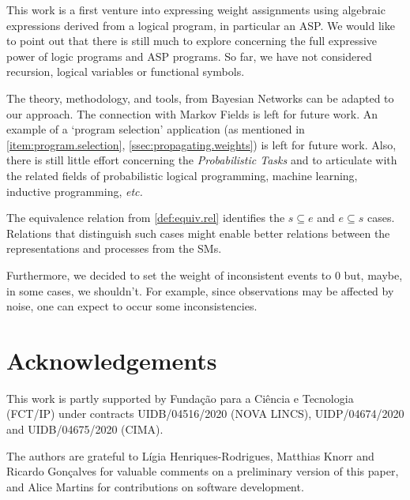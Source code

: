 \documentclass[x11names]{tlp}
\renewcommand{\cite}{\citep}
\begin{document}
This work is a first venture into expressing weight assignments using algebraic expressions derived from a logical program, in particular an \ac{ASP}.
We would like to point out that there is still much to explore concerning the full expressive power of logic programs and \ac{ASP} programs.
So far, we have not considered recursion, logical variables or functional symbols.


The theory, methodology, and tools, from Bayesian Networks can be adapted to our approach.
The connection with Markov Fields \cite{kindermann80} is left for future work.
An example of a `program selection' application (as mentioned in \cref{item:program.selection}, \cref{ssec:propagating.weights}) is left for future work.
Also, there is still little effort concerning the \emph{Probabilistic Tasks} and to articulate with the related fields of probabilistic logical programming, machine learning, inductive programming, \emph{etc.}

The equivalence relation from \cref{def:equiv.rel} identifies the $s \subseteq e$ and $e \subseteq s$ cases.
Relations that distinguish such cases might enable better relations between the representations and processes from the \aclp{SM}.

Furthermore, we decided to set the weight of inconsistent events to $0$ but, maybe, in some cases, we shouldn't.
For example, since observations may be affected by noise, one can expect to occur some inconsistencies.

\section*{Acknowledgements}

This work is partly supported by Funda\c{c}\~ao para a Ci\^{e}ncia e Tecnologia (FCT/IP) under contracts UIDB/04516/2020 (NOVA LINCS), UIDP/04674/2020 and UIDB/04675/2020 (CIMA).

The authors are grateful to Lígia Henriques-Rodrigues, Matthias Knorr and Ricardo Gonçalves for valuable comments on a preliminary version of this paper, and Alice Martins for contributions on software development.

\ifLNCS  \fi
\ifTLP%
	\ifTLPBIB
		
	\else
		
	\fi
\fi


\end{document}
